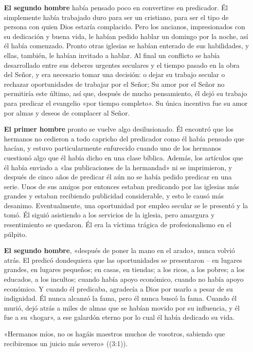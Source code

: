 \documentclass[12pt, twoside, openright]{book}
\begin{document}
\textbf{El segundo hombre} había pensado poco en convertirse en predicador. Él simplemente había trabajado duro para ser un cristiano, para ser el tipo de persona con quien Dios estaría complacido. Pero los ancianos, impresionados con su dedicación y buena vida, le habían pedido hablar un domingo por la noche, así él había comenzado. Pronto otras iglesias se habían enterado de sus habilidades, y ellas, también, le habían invitado a hablar. Al final un conflicto se había desarrollado entre sus deberes urgentes seculares y el tiempo pasado en la obra del Señor, y era necesario tomar una decisión: o dejar su trabajo secular o rechazar oportunidades de trabajar por el Señor; Su amor por el Señor no permitiría este último, así que, después de mucho pensamiento, él dejó su trabajo para predicar el evangelio «por tiempo completo». Su única incentiva fue su amor por almas y deseos de complacer al Señor. 

\textbf{El primer hombre} pronto se vuelve algo desilusionado. Él encontró que los hermanos no cedieron a todo capricho del predicador como él había pensado que hacían, y estuvo particularmente enfurecido cuando uno de los hermanos cuestionó algo que él había dicho en una clase bíblica. Además, los artículos que él había enviado a «las publicaciones de la hermandad» ni se imprimieron, y después de cinco años de predicar él aún no se había pedido predicar en una serie. Unos de sus amigos por entonces estaban predicando por las iglesias más grandes y estaban recibiendo publicidad considerable, y esto le causó más desanimo. Eventualmente, una oportunidad por empleo secular se le presentó y la tomó. Él siguió asistiendo a los servicios de la iglesia, pero amargura y resentimiento se quedaron. Él era la víctima trágica de profesionalismo en el púlpito. 

\textbf{El segundo hombre}, «después de poner la mano en el arado», nunca volvió atrás. El predicó dondequiera que las oportunidades se presentaron – en lugares grandes, en lugares pequeños; en casas, en tiendas; a los ricos, a los pobres; a los educados, a los incultos; cuando había apoyo económico, cuando no había apoyo económico. Y cuando él predicaba, agradecía a Dios por usarlo a pesar de su indignidad. Él nunca alcanzó la fama, pero él nunca buscó la fama. Cuando él murió, dejó atrás a miles de almas que se habían movido por su influencia, y él fue a su «hogar», a ese galardón eterno por lo cual él había dedicado su vida. 

«Hermanos míos, no os hagáis maestros muchos de vosotros, sabiendo que recibiremos un juicio más severo» ((3:1)). 
\end{document}
